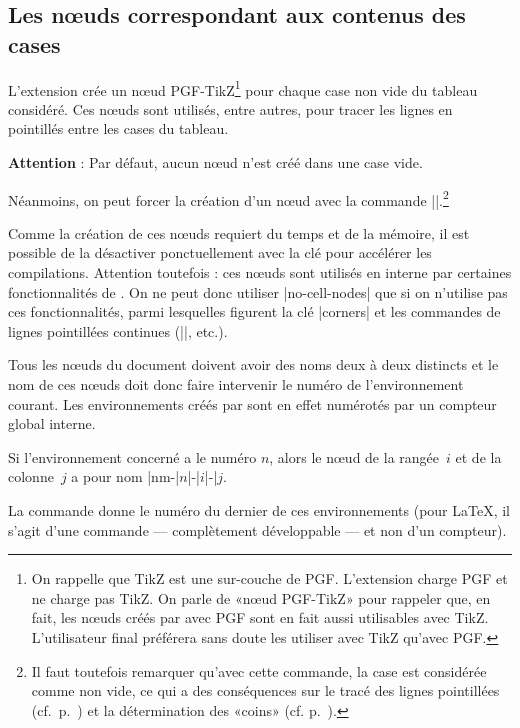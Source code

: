 \documentclass[dvipsnames]{article}%
\begin{document}
\subsection{Les nœuds correspondant aux contenus des cases}


L'extension  crée un nœud PGF-TikZ\footnote{On rappelle que TikZ
  est une sur-couche de PGF. L'extension  charge PGF et ne
  charge pas TikZ. On parle de «nœud PGF-TikZ» pour rappeler que, en fait, les
  nœuds créés par  avec PGF sont en fait aussi utilisables avec
  TikZ. L'utilisateur final préférera sans doute les utiliser avec TikZ qu'avec
  PGF.} pour chaque case non vide du tableau considéré. Ces nœuds sont utilisés,
entre autres, pour tracer les lignes en pointillés entre les cases du tableau.

\smallskip
\textbf{Attention} : Par défaut, aucun nœud n'est créé dans une case vide.

\smallskip
Néanmoins, on peut forcer la création d'un nœud avec la commande |\NotEmpty|.\footnote{Il faut toutefois remarquer qu'avec cette commande, la
  case est considérée comme non vide, ce qui a des conséquences sur le tracé des
lignes pointillées (cf.~p.~\pageref{Cdots}) et la détermination des «coins»
(cf. p.~\pageref{corners}).}

\medskip
Comme la création de ces nœuds requiert du temps et de la mémoire, il est
possible de la désactiver ponctuellement avec la clé 
pour accélérer les compilations. Attention toutefois : ces nœuds sont utilisés
en interne par certaines fonctionnalités de . On ne peut donc
utiliser |no-cell-nodes| que si on n'utilise pas ces fonctionnalités, parmi
lesquelles figurent la clé |corners| et les commandes de lignes pointillées
continues (|\Cdots|, etc.).

\medskip
Tous les nœuds du document doivent avoir des noms deux à deux distincts et le
nom de ces nœuds doit donc faire intervenir le numéro de l'environnement
courant. Les environnements créés par  sont en effet numérotés
par un compteur global interne.

\smallskip
Si l'environnement concerné a le numéro $n$, alors le nœud de la rangée~$i$ et
de la colonne~$j$ a pour nom |nm-|$n$|-|$i$|-|$j$.

\smallskip
{}
La commande  donne le numéro du dernier de
ces environnements (pour LaTeX, il s'agit d'une commande — complètement
développable — et non d'un compteur).
\end{document}
